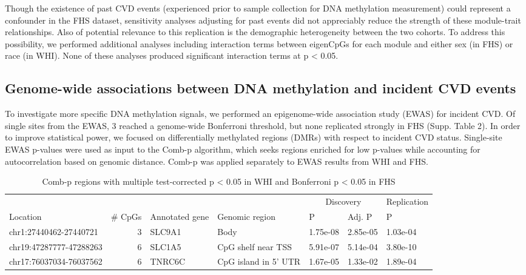 \documentclass[]{bmcart}
\theoremstyle{definition}
\theoremstyle{definition}
\theoremstyle{definition}
\theoremstyle{remark}
\begin{document}
Though the existence of past CVD events (experienced prior to sample
collection for DNA methylation measurement) could represent a confounder
in the FHS dataset, sensitivity analyses adjusting for past events did
not appreciably reduce the strength of these module-trait relationships.
Also of potential relevance to this replication is the demographic
heterogeneity between the two cohorts. To address this possibility, we
performed additional analyses including interaction terms between
eigenCpGs for each module and either sex (in FHS) or race (in WHI). None
of these analyses produced significant interaction terms at p
\textless{} 0.05.

\subsection{Genome-wide associations between DNA methylation and
incident CVD
events}\label{genome-wide-associations-between-dna-methylation-and-incident-cvd-events}

To investigate more specific DNA methylation signals, we performed an
epigenome-wide association study (EWAS) for incident CVD. Of single
sites from the EWAS, 3 reached a genome-wide Bonferroni threshold, but
none replicated strongly in FHS (Supp. Table 2). In order to improve
statistical power, we focused on differentially methylated regions
(DMRs) with respect to incident CVD status. Single-site EWAS p-values
were used as input to the Comb-p algorithm, which seeks regions enriched
for low p-values while accounting for autocorrelation based on genomic
distance. Comb-p was applied separately to EWAS results from WHI and
FHS.

\begin{table}

\caption{\label{tab:combp-results}Comb-p regions with multiple test-corrected p < 0.05 in WHI and Bonferroni p < 0.05 in FHS}
\centering
\begin{tabular}[t]{lrlllll}
\toprule
\multicolumn{1}{c}{} & \multicolumn{1}{c}{} & \multicolumn{1}{c}{} & \multicolumn{1}{c}{} & \multicolumn{2}{c}{Discovery} & \multicolumn{1}{c}{Replication} \\
\cmidrule(l{2pt}r{2pt}){5-6} \cmidrule(l{2pt}r{2pt}){7-7}
Location & \# CpGs & Annotated gene & Genomic region & P & Adj. P & P\\
\midrule
chr1:27440462-27440721 & 3 & SLC9A1 & Body & 1.75e-08 & 2.85e-05 & 1.03e-04\\
chr19:47287777-47288263 & 6 & SLC1A5 & CpG shelf near TSS & 5.91e-07 & 5.14e-04 & 3.80e-10\\
chr17:76037034-76037562 & 6 & TNRC6C & CpG island in 5' UTR & 1.67e-05 & 1.33e-02 & 1.89e-04\\
\bottomrule
\end{tabular}
\end{table}
\end{document}
